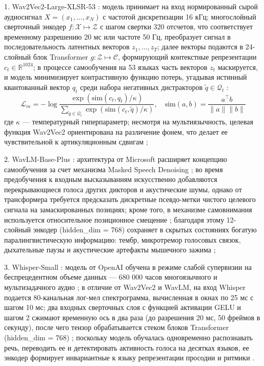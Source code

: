 \documentclass[a4paper,14pt]{extarticle}
\begin{document}
	1. Wav2Vec2-Large-XLSR-53 \cite{wav2vec}: модель принимает на вход нормированный сырой аудиосигнал $X = (x_1, \dots, x_N)$ с частотой дискретизации 16 кГц; многослойный сверточный энкодер $f: \mathcal{X} \mapsto \mathcal{Z}$ с шагом свертки 320 отсчетов, что соответствует временному разрешению 20 мс или частоте 50 Гц, преобразует сигнал в последовательность латентных векторов $z_1, \dots, z_T$; далее векторы подаются в 24-слойный блок Transformer $g: \mathcal{Z} \mapsto \mathcal{C}$, формирующий контекстные репрезентации $c_t \in \mathbb{R}^{1024}$; в процессе самообучения на 53 языках часть векторов $z_t$ маскируется, и модель минимизирует контрастивную функцию потерь, угадывая истинный квантованный вектор $q_t$ среди набора негативных дистракторов $\tilde{q} \in \mathcal{Q}_t$ \cite{wav2vec}:
	\begin{equation}
		\mathcal{L}_m = -\log \frac{\exp(\text{sim}(c_t, q_t)/\kappa)}{\sum_{\tilde{q} \in \mathcal{Q}_t} \exp(\text{sim}(c_t, \tilde{q})/\kappa)}, \quad \text{sim}(a, b) = \frac{a^\top b}{\|a\| \|b\|}
	\end{equation}
	где $\kappa$ — температурный гиперпараметр; несмотря на мультиязычность, целевая функция Wav2Vec2 ориентирована на различение фонем, что делает ее чувствительной к артикуляционным сдвигам \cite{wav2vec};
	
	2. WavLM-Base-Plus \cite{wavlm}: архитектура от Microsoft расширяет концепцию самообучения за счет механизма Masked Speech Denoising \cite{wavlm}; во время предобучения к входным высказываниям искусственно добавляются перекрывающиеся голоса других дикторов и акустические шумы, однако от трансформера требуется предсказать дискретные псевдо-метки чистого целевого сигнала на замаскированных позициях; кроме того, в механизме самовнимания используется относительное позиционное смещение \cite{wavlm}; благодаря этому 12-слойный энкодер (hidden\_dim = 768) сохраняет в скрытых состояниях богатую паралингвистическую информацию: тембр, микротремор голосовых связок, дыхательные паузы и акустические артефакты мышечного зажима \cite{wavlm};
	
	3. Whisper-Small \cite{whisper}: модель от OpenAI обучена в режиме слабой супервизии на беспрецедентном объеме данных — 680 000 часов многоязычного и мультизадачного аудио \cite{whisper}; в отличие от Wav2Vec2 и WavLM, на вход Whisper подается 80-канальная лог-мел спектрограмма, вычисленная в окнах по 25 мс с шагом 10 мс; два входных сверточных слоя с функцией активации GELU и шагом 2 сжимают временную ось в два раза (до разрешения 20 мс, 50 фреймов в секунду), после чего тензор обрабатывается стеком блоков Transformer (hidden\_dim = 768) \cite{whisper}; поскольку модель обучалась одновременно распознавать речь, переводить ее и детектировать активность голоса на десятках языков, ее энкодер формирует инвариантные к языку репрезентации просодии и ритмики \cite{whisper}.
	
\end{document}
